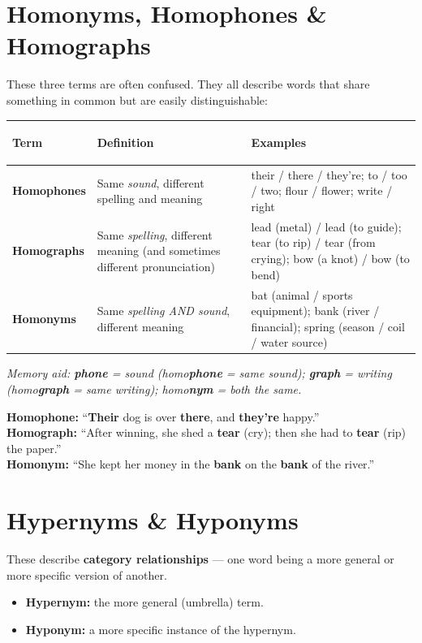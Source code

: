 \documentclass[11pt, letterpaper]{article}
\newcommand{\example}[1]{%
  \begin{tcolorbox}[colback=exbg, colframe=exborder,
    title={\bfseries Example}, arc=3pt, boxrule=1pt]
  #1
  \end{tcolorbox}%
}
\begin{document}
\section*{Homonyms, Homophones \& Homographs}

These three terms are often confused. They all describe words that share something in common
but are easily distinguishable:

\noindent
{\renewcommand{\arraystretch}{1.6}
\begin{tabularx}{\textwidth}{>{\bfseries\raggedright\arraybackslash}p{3.5cm}
                              >{\raggedright\arraybackslash}X
                              >{\raggedright\arraybackslash}p{3.8cm}}
\toprule
\rowcolor{tableheadergreen}
\textbf{Term} & \textbf{Definition} & \textbf{Examples} \\
\midrule
\rowcolor{rowA}  \textbf{Homophones}  & Same \emph{sound}, different spelling and meaning & their / there / they're; to / too / two; flour / flower; write / right \\
\rowcolor{rowBg} \textbf{Homographs}  & Same \emph{spelling}, different meaning (and sometimes different pronunciation) & lead (metal) / lead (to guide); tear (to rip) / tear (from crying); bow (a knot) / bow (to bend) \\
\rowcolor{rowA}  \textbf{Homonyms}    & Same \emph{spelling AND sound}, different meaning & bat (animal / sports equipment); bank (river / financial); spring (season / coil / water source) \\
\bottomrule
\end{tabularx}}

\textit{Memory aid: \textbf{phone} = sound (homo\textbf{phone} = same sound); \textbf{graph} = writing (homo\textbf{graph} = same writing); homo\textbf{nym} = both the same.}

\example{
\textbf{Homophone:} ``\textbf{Their} dog is over \textbf{there}, and \textbf{they're} happy.''\\
\textbf{Homograph:} ``After winning, she shed a \textbf{tear} (cry); then she had to \textbf{tear} (rip) the paper.''\\
\textbf{Homonym:} ``She kept her money in the \textbf{bank} on the \textbf{bank} of the river.''
}

\section*{Hypernyms \& Hyponyms}

These describe \textbf{category relationships} --- one word being a more general or more
specific version of another.
\begin{itemize}[noitemsep]
  \item \textbf{Hypernym:} the more general (umbrella) term.
  \item \textbf{Hyponym:} a more specific instance of the hypernym.
\end{itemize}
\end{document}
